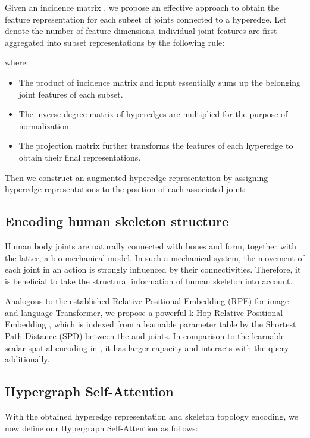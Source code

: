\documentclass[10pt,twocolumn,letterpaper]{article}
\begin{document}
Given an incidence matrix , we propose an effective approach to obtain the feature representation for each subset of joints connected to a hyperedge. 
Let  denote the number of feature dimensions, individual joint features  are first aggregated into subset representations  by the following rule:

where:
\begin{itemize}
    \item The product of incidence matrix  and input  essentially sums up the belonging joint features of each subset. 
    \item The inverse degree matrix of hyperedges are multiplied for the purpose of normalization. 
    \item The projection matrix  further transforms the features of each hyperedge to obtain their final representations.
\end{itemize}




Then we construct an augmented hyperedge representation  by assigning hyperedge representations to the position of each associated joint:







\subsection{Encoding human skeleton structure}
Human body joints are naturally connected with bones and form, together with the latter, a bio-mechanical model. In such a mechanical system, the movement of each joint in an action is strongly influenced by their connectivities. Therefore, it is beneficial to take the structural information of human skeleton into account.

Analogous to the established Relative Positional Embedding (RPE) for image \cite{wu2021rethinking} and language \cite{he2020deberta, shaw2018self} Transformer, we propose a powerful k-Hop Relative Positional Embedding , which is indexed from a learnable parameter table by the Shortest Path Distance (SPD) between the  and  joints. 
In comparison to the learnable scalar spatial encoding in \cite{ying2021transformers}, it has larger capacity and interacts with the query additionally.



\subsection{Hypergraph Self-Attention}
With the obtained hyperedge representation and skeleton topology encoding, we now define our Hypergraph Self-Attention as follows:
\end{document}
